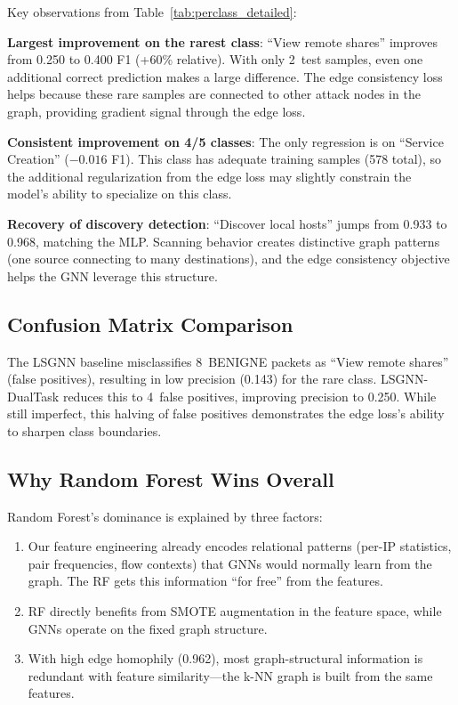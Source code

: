 \documentclass[conference]{IEEEtran}
\begin{document}
Key observations from Table~\ref{tab:perclass_detailed}:

\textbf{Largest improvement on the rarest class}: ``View remote shares'' improves from 0.250 to 0.400 F1 (+60\% relative). With only 2~test samples, even one additional correct prediction makes a large difference. The edge consistency loss helps because these rare samples are connected to other attack nodes in the graph, providing gradient signal through the edge loss.

\textbf{Consistent improvement on 4/5 classes}: The only regression is on ``Service Creation'' ($-0.016$ F1). This class has adequate training samples (578 total), so the additional regularization from the edge loss may slightly constrain the model's ability to specialize on this class.

\textbf{Recovery of discovery detection}: ``Discover local hosts'' jumps from 0.933 to 0.968, matching the MLP. Scanning behavior creates distinctive graph patterns (one source connecting to many destinations), and the edge consistency objective helps the GNN leverage this structure.

\subsection{Confusion Matrix Comparison}

The LSGNN baseline misclassifies 8~BENIGNE packets as ``View remote shares'' (false positives), resulting in low precision (0.143) for the rare class. LSGNN-DualTask reduces this to 4~false positives, improving precision to 0.250. While still imperfect, this halving of false positives demonstrates the edge loss's ability to sharpen class boundaries.

\subsection{Why Random Forest Wins Overall}

Random Forest's dominance is explained by three factors:
\begin{enumerate}
    \item Our feature engineering already encodes relational patterns (per-IP statistics, pair frequencies, flow contexts) that GNNs would normally learn from the graph. The RF gets this information ``for free'' from the features.
    \item RF directly benefits from SMOTE augmentation in the feature space, while GNNs operate on the fixed graph structure.
    \item With high edge homophily (0.962), most graph-structural information is redundant with feature similarity---the k-NN graph is built from the same features.
\end{enumerate}
\end{document}
